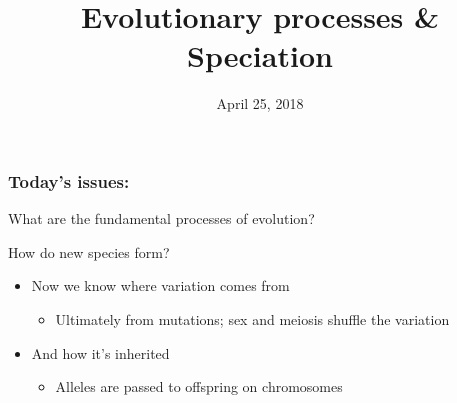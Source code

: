 \documentclass[14pt,table]{beamer}
\title[Evolutionary processes \& Speciation]{Evolutionary processes \& Speciation}
\date{April 25, 2018}
\begin{document}
\maketitle

\begin{frame}
\frametitle{Today's issues:}
What are the fundamental processes of evolution?

\vspace{2cm}
How do new species form?
\end{frame}

\begin{frame}
\begin{adjustwidth}{-1.5em}{-1.5em}
    \begin{itemize}
        \item<1-> Now we know where variation comes from
        \begin{itemize}
            \item<2-> Ultimately from mutations; sex and meiosis shuffle the variation
        \end{itemize}
        \item<3-> And how it's inherited
        \begin{itemize}
            \item<4-> Alleles are passed to offspring on chromosomes 
        \end{itemize}
    \end{itemize}

    \vspace{2cm}
\end{adjustwidth}
\end{frame}
\end{document}
